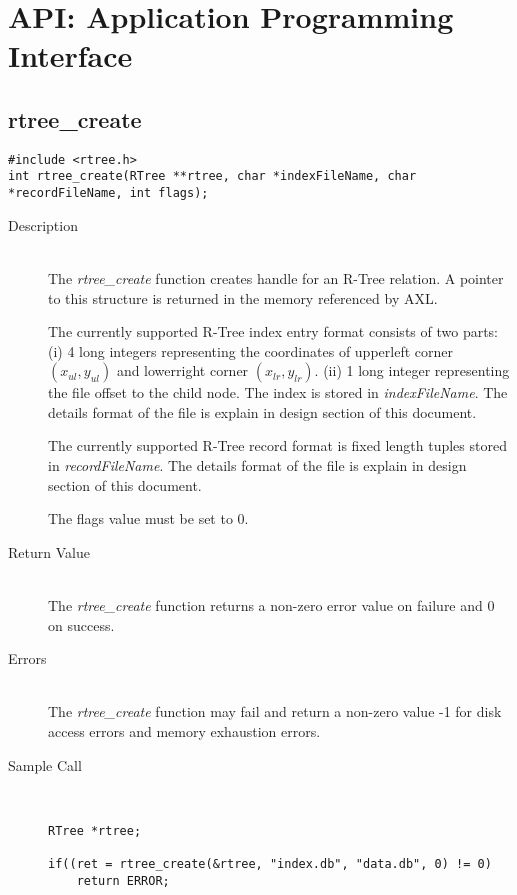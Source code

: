 \documentclass[12pt]{article}
\begin{document}
\newpage
\section{API: Application Programming Interface}

\subsection{rtree\_create}
\begin{verbatim}
#include <rtree.h>
int rtree_create(RTree **rtree, char *indexFileName, char *recordFileName, int flags);
\end{verbatim}
\begin{description}
\item[Description]\ \\
  The {\em rtree\_create} function creates handle for an R-Tree
  relation.  A pointer to this structure is returned in the memory
  referenced by AXL.

  The currently supported R-Tree index entry format consists of
  two parts: (i) 4 long integers representing the coordinates of
  upperleft corner $(x_{ul},y_{ul})$ and lowerright corner
  $(x_{lr},y_{lr})$. (ii) 1 long integer representing the file offset
  to the child node.  The index is stored in {\em indexFileName}.
  The details format of the file is explain in design section of
  this document.

  The currently supported R-Tree record format is fixed length
  tuples stored in {\em recordFileName}.  The details format of
  the file is explain in design section of this document.
  
  The flags value must be set to 0.

\item[Return Value]\ \\
  The {\em rtree\_create} function returns a non-zero error value on
  failure and 0 on success.
\item[Errors]\ \\
  The {\em rtree\_create} function may fail and return a non-zero
  value -1 for disk access errors and memory exhaustion errors.
\item[Sample Call]\ 
\begin{verbatim}
RTree *rtree;

if((ret = rtree_create(&rtree, "index.db", "data.db", 0) != 0)
    return ERROR;
\end{verbatim}
\end{description}
\end{document}

